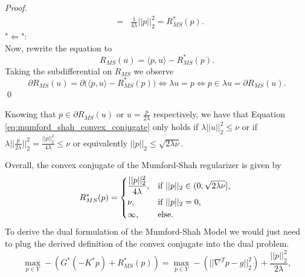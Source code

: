 \begin{enumerate}
\begin{proof}
\begin{eqnarray}
                                &=& \frac{1}{4\lambda} ||p||_{2}^{2} = R_{MS}^{\ast}(p).
                            \end{eqnarray}
                        "$\Longleftarrow$":\\
                        Now, rewrite the equation to
                            $$
                                R_{MS}(u) = \langle p, u \rangle - R_{MS}^{\ast}(p).
                            $$
                        Taking the subdifferential on $R_{MS}$ we observe
                            $$
                                \partial R_{MS}(u) = \partial \bigg( \langle p, u \rangle - R_{MS}^{\ast}(p) \bigg) \Longleftrightarrow \lambda u = p \Longleftrightarrow p \in \lambda u = \partial R_{MS}(u).
                            $$
                        \qed
                    \end{proof}
                Knowing that $p \in \partial R_{MS}(u)$ or $u = \frac{p}{2\lambda}$ respectively, we have that Equation \ref{eq:mumford_shah_convex_conjugate} only holds if $\lambda ||u||_{2}^{2} \le \nu$ or if $\lambda ||\frac{p}{2\lambda}||_{2}^{2} = \frac{||p||_{2}^{2}}{4\lambda} \le \nu$ or equivalently $||p||_{2} \le \sqrt{2\lambda \nu}$.
            \end{enumerate}
        Overall, the convex conjugate of the Mumford-Shah regularizer is given by
            \begin{equation}
                R_{MS}^{\ast}(p) =
                    \begin{dcases*}
                        \frac{||p||_{2}^{2}}{4\lambda}, & \textnormal{if $||p||_{2} \in (0, \sqrt{2\lambda \nu}]$,} \\
                        \nu, & \textnormal{if $||p||_{2} = 0$,} \\
                        \infty, & \textnormal{else.}
                    \end{dcases*}
                \label{eq:r_star}
            \end{equation}
        To derive the dual formulation of the Mumford-Shah Model we would just need to plug the derived definition of the convex conjugate into the dual problem.
            $$
                \max_{p \in Y} - (G^{\ast}(-K^{\ast}p) + R_{MS}^{\ast}(p)) = \max_{p \in Y} -(||\nabla^{T}p - g||_{2}^{2}) + \frac{||p||_{2}^{2}}{2\lambda},
            $$
